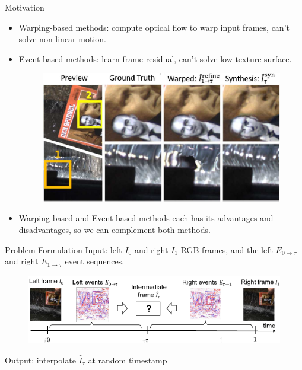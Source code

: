\documentclass[aspectratio=43]{beamer}
\begin{document}
	\begin{frame}{Motivation}
		\begin{itemize}
			\item Warping-based methods: compute \alert{optical flow} to \alert{warp input frames}, can't solve \alert{non-linear motion}.
			\item Event-based methods: learn \alert{frame residual}, can't solve \alert{low-texture surface}.
			\begin{figure}
				\centering\includegraphics[width=0.7\linewidth]{images/warping_based_vs_event_based.png}
			\end{figure}
			\item<2> Warping-based and Event-based methods each has its advantages and disadvantages, so we can \alert{complement} both methods.
		\end{itemize}
	\end{frame}

	\begin{frame}{Problem Formulation}
		Input: left $ I_0 $  and right $ I_1 $ RGB frames, and the left $ E_{0 \rightarrow \tau} $ and right $ E_{1 \rightarrow \tau} $ event sequences.
		\begin{figure}
			\centering\includegraphics[width=0.8\linewidth]{images/problem formulation.png}
		\end{figure}
		Output: interpolate $ \hat{I}_{\tau} $ at random timestamp
	\end{frame}
\end{document}
